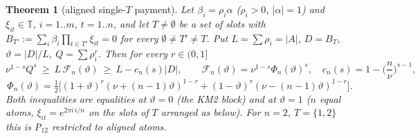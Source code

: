 \documentclass[11pt]{article}
\newtheorem{theorem}{Theorem}
\theoremstyle{remark}
\begin{document}
\begin{theorem}[aligned single-$T$ payment]\label{thm:pt}
Let $\beta_i=\rho_i\alpha$ ($\rho_i>0$, $|\alpha|=1$) and $\xi_{it}\in\mathbb T$, $i=1..m$, $t=1..n$, and let $T\ne\emptyset$ be a set of slots
with $B_{T'}:=\sum_i\beta_i\prod_{t\in T'}\xi_{it}=0$ for every $\emptyset\ne T'\ne T$. Put $L=\sum\rho_i=|A|$, $D=B_T$, $\vartheta=|D|/L$,
$Q=\sum\rho_i^r$. Then for every $r\in(0,1]$
\[
\nu^{1-s}Q^s\ \ge\ L\,\mathcal F_n(\vartheta)\ \ge\ L-c_n(s)|D|,\qquad
\mathcal F_n(\vartheta)=\nu^{1-s}\Phi_n(\vartheta)^s,\quad c_n(s)=1-\Big(\frac n\nu\Big)^{s-1},
\]
\[
\Phi_n(\vartheta)=\tfrac12\big[(1+\vartheta)^r(\nu+(n-1)\vartheta)^{1-r}+(1-\vartheta)^r(\nu-(n-1)\vartheta)^{1-r}\big].
\]
Both inequalities are equalities at $\vartheta=0$ (the KM2 block) and at $\vartheta=1$ ($n$ equal atoms,
$\xi_{it}=e^{2\pi i\,i/n}$ on the slots of $T$ arranged as below). For $n=2$, $T=\{1,2\}$ this is P$_{12}$ restricted to aligned atoms.
\end{theorem}
\end{document}
